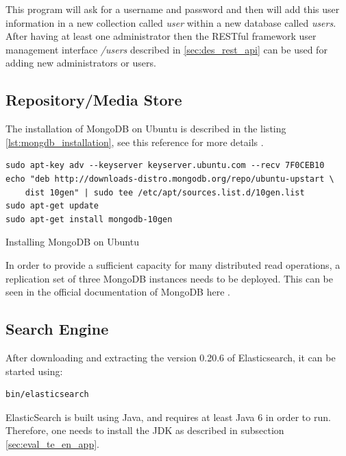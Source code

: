 This program will ask for a username and password and then will add this user information in a new collection called \textit{user} within a new database called \textit{users}.  After having at least one administrator then the RESTful framework user management interface \textit{/users} described in \ref{sec:des_rest_api} can be used for adding new administrators or users.

\subsection{Repository/Media Store\label{sec:eval_te_en_mongo}}
The installation of MongoDB on Ubuntu is described in the listing \ref{lst:mongdb_installation}, see this reference for more details \cite{MongoDb:installation}.  
\begin{code}
\begin{verbatim}
sudo apt-key adv --keyserver keyserver.ubuntu.com --recv 7F0CEB10
echo "deb http://downloads-distro.mongodb.org/repo/ubuntu-upstart \
	dist 10gen" | sudo tee /etc/apt/sources.list.d/10gen.list
sudo apt-get update
sudo apt-get install mongodb-10gen
\end{verbatim}
\caption{Installing MongoDB on Ubuntu}
\label{lst:mongdb_installation}
\end{code}

In order to provide a sufficient capacity for many distributed read operations, a replication set of three MongoDB instances needs to be deployed. This can be seen in the official documentation of MongoDB here \cite{mongodb_replica_set}.

\subsection{Search Engine\label{sec:eval_te_se}}
After downloading  and extracting the version 0.20.6 of Elasticsearch, it can be started using:
\begin{code}
\begin{verbatim}
bin/elasticsearch
\end{verbatim}
\end{code}

ElasticSearch is built using Java, and requires at least Java 6 in order to run. Therefore, one needs to install the \ac{JDK} as described in subsection \ref{sec:eval_te_en_app}.

